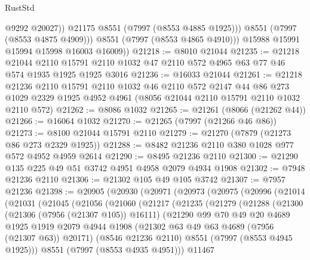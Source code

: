 \begin{lexlean}{RustStd}
\begin{coremodule}
{\begin{coremodule}
{{{{{{{{{{{{{{{{{{{{{{{{{{{{{{{{{{{{{{{{{{{                  @9292
                  @20027))
              @21175
              @8551
              (@7997 (@8553 @4885 @1925)))
            @8551
            (@7997 (@8553 @4875 @4909)))
          @8551
          (@7997 (@8553 @4865 @4910)))
        @15988
        @15991
        @15994
        @15998
        @16003
        @16009))
@21218 := @8010 @21044
@21235 := @21218
    @21044
    @2110
    @15791
    @2110
    @1032
    @47
    @2110
    @572
    @4965
    @63
    @77
    @46
    @574
    @1935
    @1925
    @1925
    @3016
@21236 := @16033 @21044
@21261 := @21218
    @21236
    @2110
    @15791
    @2110
    @1032
    @46
    @2110
    @572
    @2147
    @44
    @86
    @273
    @1029
    @2329
    @1925
    @4952
    @4961
    (@8056 @21044 @2110 @15791 @2110 @1032 @2110 @572)
@21262 := @8086 @1032
@21265 := @21261 (@8066 (@21262 @44))
@21266 := @16064 @1032
@21270 := @21265 (@7997 (@21266 @46 @86))
@21273 := @8100 @21044 @15791 @2110
@21279 := @21270 (@7879 (@21273 @86 @273 @2329 @1925))
@21288 := @8482 @21236 @2110 @380 @1028 @977 @572 @4952 @4959 @2614
@21290 := @8495 @21236 @2110
@21300 := @21290 @135 @225 @49 @51 @3742 @4951 @4958 @2079 @4934 @1908
@21302 := @7948 @21236 @2110
@21306 := @21302 @105 @49 @105 @3742
@21307 := @7957 @21236
@21398 := @20905
    (@20930
      (@20971
        (@20973
          (@20975
            (@20996
              (@21014
                (@21031
                  (@21045
                    (@21056
                      (@21060
                        (@21217
                          (@21235
                            (@21279
                              (@21288
                                (@21300
                                  (@21306 (@7956 (@21307 @105)) @16111)
                                  (@21290
                                    @99
                                    @70
                                    @49
                                    @20
                                    @4689
                                    @1925
                                    @1919
                                    @2079
                                    @4944
                                    @1908
                                    (@21302 @63 @49 @63 @4689 (@7956 (@21307 @63)) @20171)
                                    (@8546 @21236 @2110)
                                    @8551
                                    (@7997 (@8553 @4945 @1925)))
                                  @8551
                                  (@7997 (@8553 @4935 @4951)))
                                @11467
}}}}}}}}}}}}}}}}}}}}}}}}}}}}}}}}}}}}}}}}}}}
\end{coremodule}}
\end{coremodule}
\end{lexlean}
